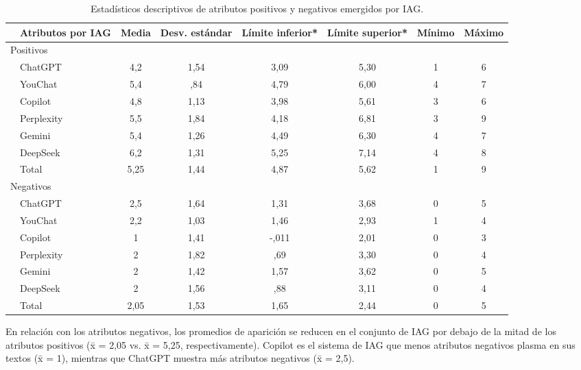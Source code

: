 \documentclass[spanish]{textolivre}
\begin{document}
\begin{table}[htbp]
\centering
\begin{threeparttable}
\caption{Estadísticos descriptivos de atributos positivos y negativos emergidos por IAG.}\label{tab-4}
\begin{tabular}{llcccccc}
\toprule
 & Atributos por IAG & Media & Desv. estándar & \multicolumn{1}{p{2cm}}{Límite inferior*} & \multicolumn{1}{p{2cm}}{Límite superior*} & Mínimo & Máximo \\
\midrule
\multicolumn{8}{l}{Positivos} \\
 & ChatGPT & 4,2 & 1,54 & 3,09 & 5,30 & 1 & 6 \\
 & YouChat & 5,4 & ,84 & 4,79 & 6,00 & 4 & 7 \\
 & Copilot & 4,8 & 1,13 & 3,98 & 5,61 & 3 & 6 \\
 & Perplexity & 5,5 & 1,84 & 4,18 & 6,81 & 3 & 9 \\
 & Gemini & 5,4 & 1,26 & 4,49 & 6,30 & 4 & 7 \\
 & DeepSeek & 6,2 & 1,31 & 5,25 & 7,14 & 4 & 8 \\
 & Total & 5,25 & 1,44 & 4,87 & 5,62 & 1 & 9 \\
\midrule
\multicolumn{8}{l}{Negativos} \\
 & ChatGPT & 2,5 & 1,64 & 1,31 & 3,68 & 0 & 5 \\
 & YouChat & 2,2 & 1,03 & 1,46 & 2,93 & 1 & 4 \\
 & Copilot & 1 & 1,41 & -,011 & 2,01 & 0 & 3 \\
 & Perplexity & 2 & 1,82 & ,69 & 3,30 & 0 & 4 \\
 & Gemini & 2 & 1,42 & 1,57 & 3,62 & 0 & 5 \\
 & DeepSeek & 2 & 1,56 & ,88 & 3,11 & 0 & 4 \\
 & Total & 2,05 & 1,53 & 1,65 & 2,44 & 0 & 5 \\
\bottomrule
\end{tabular}
\end{threeparttable}
\end{table}

En relación con los atributos negativos, los promedios de aparición se reducen en el conjunto de IAG por debajo de la mitad de los atributos positivos (x̄ = 2,05 vs. x̄ = 5,25, respectivamente). Copilot es el sistema de IAG que menos atributos negativos plasma en sus textos (x̄ = 1), mientras que ChatGPT muestra más atributos negativos (x̄ = 2,5).
\end{document}
